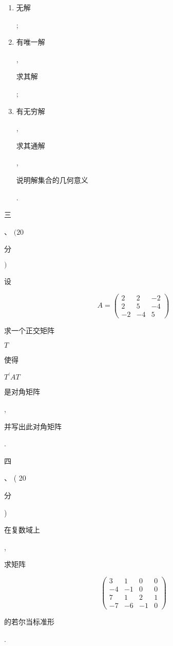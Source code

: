 \documentclass[10pt]{article}
\begin{document}
\begin{enumerate}
  \item \begin{CJK}{UTF8}{mj}无解\end{CJK};

  \item \begin{CJK}{UTF8}{mj}有唯一解\end{CJK}, \begin{CJK}{UTF8}{mj}求其解\end{CJK};

  \item \begin{CJK}{UTF8}{mj}有无穷解\end{CJK}, \begin{CJK}{UTF8}{mj}求其通解\end{CJK}, \begin{CJK}{UTF8}{mj}说明解集合的几何意义\end{CJK}.

\end{enumerate}
\begin{CJK}{UTF8}{mj}三\end{CJK}、 $(20$ \begin{CJK}{UTF8}{mj}分\end{CJK} $)$ \begin{CJK}{UTF8}{mj}设\end{CJK}
$$
A=\left(\begin{array}{ccc}
2 & 2 & -2 \\
2 & 5 & -4 \\
-2 & -4 & 5
\end{array}\right)
$$
\begin{CJK}{UTF8}{mj}求一个正交矩阵\end{CJK} $T$ \begin{CJK}{UTF8}{mj}使得\end{CJK} $T^{\prime} A T$ \begin{CJK}{UTF8}{mj}是对角矩阵\end{CJK}, \begin{CJK}{UTF8}{mj}并写出此对角矩阵\end{CJK}.

\begin{CJK}{UTF8}{mj}四\end{CJK}、 ( 20 \begin{CJK}{UTF8}{mj}分\end{CJK}) \begin{CJK}{UTF8}{mj}在复数域上\end{CJK}, \begin{CJK}{UTF8}{mj}求矩阵\end{CJK}
$$
\left(\begin{array}{cccc}
3 & 1 & 0 & 0 \\
-4 & -1 & 0 & 0 \\
7 & 1 & 2 & 1 \\
-7 & -6 & -1 & 0
\end{array}\right)
$$
\begin{CJK}{UTF8}{mj}的若尔当标准形\end{CJK}.
\end{document}
